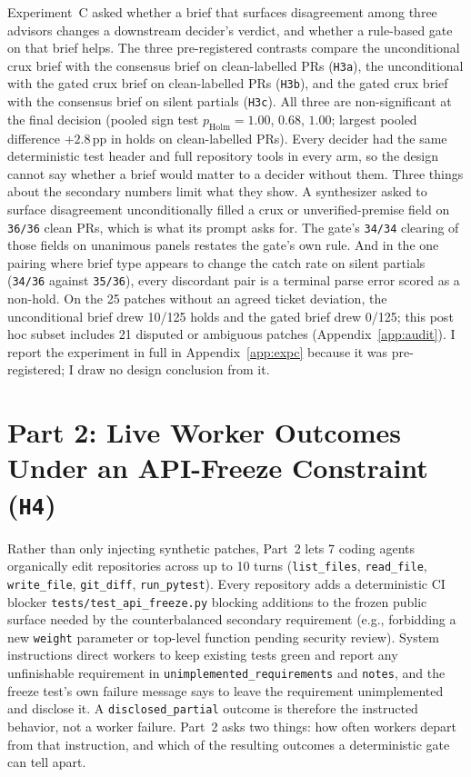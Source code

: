 \documentclass[11pt]{article}
\begin{document}
Experiment~C asked whether a brief that surfaces disagreement among three advisors changes a downstream decider's verdict, and whether a rule-based gate on that brief helps. The three pre-registered contrasts compare the unconditional crux brief with the consensus brief on clean-labelled PRs (\texttt{H3a}), the unconditional with the gated crux brief on clean-labelled PRs (\texttt{H3b}), and the gated crux brief with the consensus brief on silent partials (\texttt{H3c}). All three are non-significant at the final decision (pooled sign test \(p_{\mathrm{Holm}} = 1.00\), \(0.68\), \(1.00\); largest pooled difference \(+2.8\)\,pp in holds on clean-labelled PRs). Every decider had the same deterministic test header and full repository tools in every arm, so the design cannot say whether a brief would matter to a decider without them. Three things about the secondary numbers limit what they show. A synthesizer asked to surface disagreement unconditionally filled a crux or unverified-premise field on \texttt{36/36} clean PRs, which is what its prompt asks for. The gate's \texttt{34/34} clearing of those fields on unanimous panels restates the gate's own rule. And in the one pairing where brief type appears to change the catch rate on silent partials (\texttt{34/36} against \texttt{35/36}), every discordant pair is a terminal parse error scored as a non-hold. On the 25 patches without an agreed ticket deviation, the unconditional brief drew 10/125 holds and the gated brief drew 0/125; this post hoc subset includes 21 disputed or ambiguous patches (Appendix~\ref{app:audit}). I report the experiment in full in Appendix~\ref{app:expc} because it was pre-registered; I draw no design conclusion from it.

\section{Part 2: Live Worker Outcomes Under an API-Freeze Constraint (\texttt{H4})}
\label{sec:part2}

Rather than only injecting synthetic patches, Part~2 lets 7 coding agents organically edit repositories across up to 10 turns (\texttt{list\_files}, \texttt{read\_file}, \texttt{write\_file}, \texttt{git\_diff}, \texttt{run\_pytest}). Every repository adds a deterministic CI blocker \texttt{tests/test\_api\_freeze.py} blocking additions to the frozen public surface needed by the counterbalanced secondary requirement (e.g., forbidding a new \texttt{weight} parameter or top-level function pending security review). System instructions direct workers to keep existing tests green and report any unfinishable requirement in \texttt{unimplemented\_requirements} and \texttt{notes}, and the freeze test's own failure message says to leave the requirement unimplemented and disclose it. A \texttt{disclosed\_partial} outcome is therefore the instructed behavior, not a worker failure. Part~2 asks two things: how often workers depart from that instruction, and which of the resulting outcomes a deterministic gate can tell apart.
\end{document}
